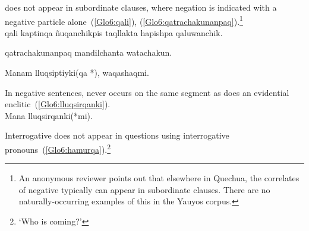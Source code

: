 \noindent
{} does not appear in subordinate clauses, where negation is indicated with a negative particle alone~(\ref{Glo6:qali}), (\ref{Glo6:qatrachakunanpaq}).\footnote{An anonymous reviewer points out that elsewhere in Quechua, the correlates of negative  typically can appear in subordinate clauses. There are no naturally-occurring examples of this in the Yauyos corpus.}\\

%
{ qali kaptinqa ñuqanchikpis taqllakta hapishpa qaluwanchik.}%
{}%
{}{}%

%
{ qatrachakunanpaq mandilchanta watachakun.}%
{}%
{}{}%

%
{Manam lluqsiptiyki(qa *), waqashaqmi.}%
{}%
{}{}%

\noindent
In negative sentences,  never occurs on the same segment as does an evidential enclitic~(\ref{Glo6:lluqsirqanki}).\\

%
{Mana lluqsirqanki(*mi).}%
{}%
{}{}%

\noindent
Interrogative  does not appear in questions using interrogative pronouns~(\ref{Glo6:hamurqa}).\footnote{    ‘Who is coming?’}\\

